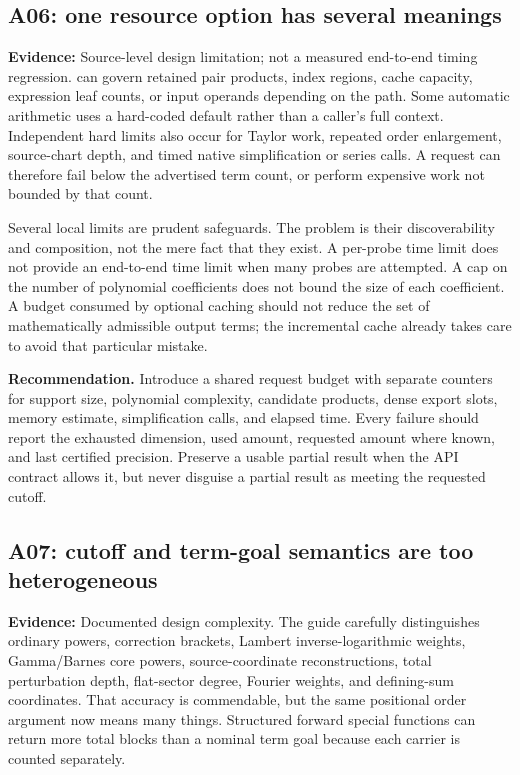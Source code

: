 \documentclass[11pt,a4paper]{article}
\newcommand{\code}[1]{\texttt{\detokenize{#1}}}
\newcommand{\status}[1]{\textbf{Evidence:} #1.}
\theoremstyle{remark}\newtheorem{remark}[proposition]{Remark}
\begin{document}
\subsection{A06: one resource option has several meanings}
\status{Source-level design limitation; not a measured end-to-end timing regression}
\code{"MaxTerms"} can govern retained pair products, index regions, cache capacity, expression leaf counts, or input operands depending on the path. Some automatic arithmetic uses a hard-coded default rather than a caller's full context. Independent hard limits also occur for Taylor work, repeated order enlargement, source-chart depth, and timed native simplification or series calls. A request can therefore fail below the advertised term count, or perform expensive work not bounded by that count.\cite{core,arithmetic,incremental,sourcecharts,native}

Several local limits are prudent safeguards. The problem is their discoverability and composition, not the mere fact that they exist. A per-probe time limit does not provide an end-to-end time limit when many probes are attempted. A cap on the number of polynomial coefficients does not bound the size of each coefficient. A budget consumed by optional caching should not reduce the set of mathematically admissible output terms; the incremental cache already takes care to avoid that particular mistake.\cite{incremental}

\textbf{Recommendation.} Introduce a shared request budget with separate counters for support size, polynomial complexity, candidate products, dense export slots, memory estimate, simplification calls, and elapsed time. Every failure should report the exhausted dimension, used amount, requested amount where known, and last certified precision. Preserve a usable partial result when the API contract allows it, but never disguise a partial result as meeting the requested cutoff.

\subsection{A07: cutoff and term-goal semantics are too heterogeneous}
\status{Documented design complexity}
The guide carefully distinguishes ordinary powers, correction brackets, Lambert inverse-logarithmic weights, Gamma/Barnes core powers, source-coordinate reconstructions, total perturbation depth, flat-sector degree, Fourier weights, and defining-sum coordinates. That accuracy is commendable, but the same positional order argument now means many things. Structured forward special functions can return more total blocks than a nominal term goal because each carrier is counted separately.\cite{guide}
\end{document}
